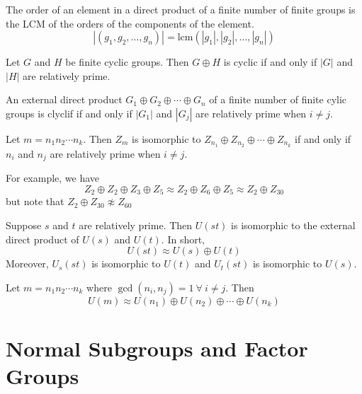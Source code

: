 \documentclass[12pt]{scrartcl}
\begin{document}
\begin{theorem}
  The order of an element in a direct product of a finite number of finite groups is the LCM of the orders of the components of the element. 
  \[|(g_1, g_2, \ldots, g_n)| = \text{lcm}(|g_1|, |g_2|, \ldots, |g_n|)\]
\end{theorem}

\begin{theorem}
  Let $G$ and $H$ be finite cyclic groups. Then $G \oplus H$ is cyclic if and only if $|G|$ and $|H|$ are relatively prime. 
\end{theorem}

\begin{corollary}
  An external direct product $G_1 \oplus G_2 \oplus \cdots \oplus G_n$ of a finite number of finite 
  cylic groups is clyclif if and only if $|G_1|$ and $|G_j|$ are relatively prime when $i \neq j$. 
\end{corollary}

\begin{corollary}
  Let $m = n_1n_2\cdots n_k$. Then $Z_m$ is isomorphic to $Z_{n_1} \oplus Z_{n_2} \oplus \cdots \oplus Z_{n_k}$ if and only if 
  $n_i$ and $n_j$ are relatively prime when $i \neq j$. 
\end{corollary}

\begin{example}
  For example, we have 
  \[Z_2 \oplus Z_2 \oplus Z_3 \oplus Z_5 \approx Z_2 \oplus Z_6 \oplus Z_5 \approx Z_2 \oplus Z_{30}\]
  but note that $Z_2 \oplus Z_{30} \not\approx Z_{60}$
\end{example}

\begin{theorem}
  Suppose $s$ and $t$ are relatively prime. Then $U(st)$ is isomorphic to the external direct product of 
  $U(s)$ and $U(t)$. In short, 
  \[U(st) \approx U(s) \oplus U(t)\]
  Moreover, $U_s(st)$ is isomorphic to $U(t)$ and $U_t(st)$ is isomorphic to $U(s)$. 
\end{theorem}

\begin{corollary}
  Let $m = n_1n_2 \cdots n_k$ where $\gcd(n_i, n_j) = 1 \ \forall \ i \neq j$. Then 
  \[U(m) \approx U(n_1) \oplus U(n_2) \oplus \cdots \oplus U(n_k)\]
\end{corollary}

\section{Normal Subgroups and Factor Groups}
\end{document}
